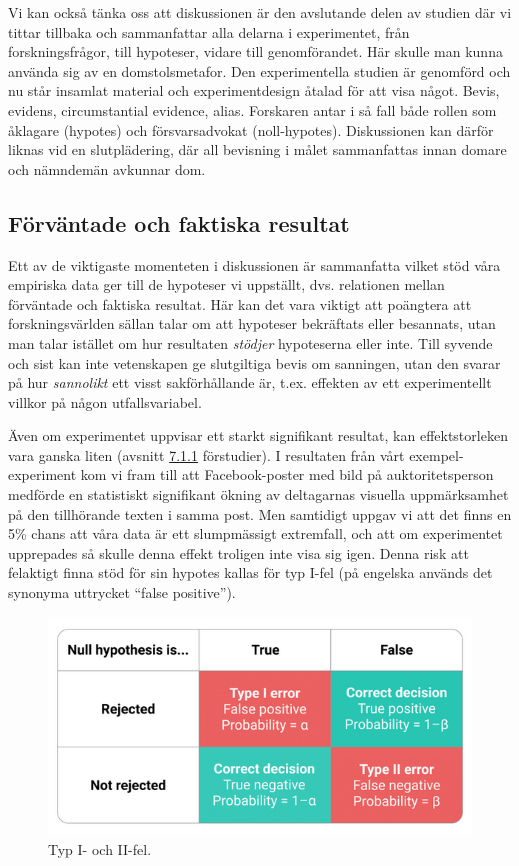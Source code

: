\documentclass[
]{book}
\begin{document}
Vi kan också tänka oss att diskussionen är den avslutande delen av studien där vi tittar tillbaka och sammanfattar alla delarna i experimentet, från forskningsfrågor, till hypoteser, vidare till genomförandet. Här skulle man kunna använda sig av en domstolsmetafor. Den experimentella studien är genomförd och nu står insamlat material och experimentdesign åtalad för att visa något. Bevis, evidens, circumstantial evidence, alias. Forskaren antar i så fall både rollen som åklagare (hypotes) och försvarsadvokat (noll-hypotes). Diskussionen kan därför liknas vid en slutplädering, där all bevisning i målet sammanfattas innan domare och nämndemän avkunnar dom.

\hypertarget{sub08.2.1}{%
\subsection{Förväntade och faktiska resultat}\label{sub08.2.1}}

Ett av de viktigaste momenteten i diskussionen är sammanfatta vilket stöd våra empiriska data ger till de hypoteser vi uppställt, dvs. relationen mellan förväntade och faktiska resultat. Här kan det vara viktigt att poängtera att forskningsvärlden sällan talar om att hypoteser bekräftats eller besannats, utan man talar istället om hur resultaten \emph{stödjer} hypoteserna eller inte. Till syvende och sist kan inte vetenskapen ge slutgiltiga bevis om sanningen, utan den svarar på hur \emph{sannolikt} ett visst sakförhållande är, t.ex. effekten av ett experimentellt villkor på någon utfallsvariabel.

Även om experimentet uppvisar ett starkt signifikant resultat, kan effektstorleken vara ganska liten (avsnitt \protect\hyperlink{sub07.1.1}{7.1.1} förstudier). I resultaten från vårt exempel-experiment kom vi fram till att Facebook-poster med bild på auktoritetsperson medförde en statistiskt signifikant ökning av deltagarnas visuella uppmärksamhet på den tillhörande texten i samma post. Men samtidigt uppgav vi att det finns en 5\% chans att våra data är ett slumpmässigt extremfall, och att om experimentet upprepades så skulle denna effekt troligen inte visa sig igen. Denna risk att felaktigt finna stöd för sin hypotes kallas för typ I-fel (på engelska används det synonyma uttrycket ``false positive'').

\begin{figure}

{\centering \includegraphics[width=0.8\linewidth]{../fig/type-error} 

}

\caption{Typ I- och II-fel.}\label{fig:fig-02-08-2-1}
\end{figure}
\end{document}
